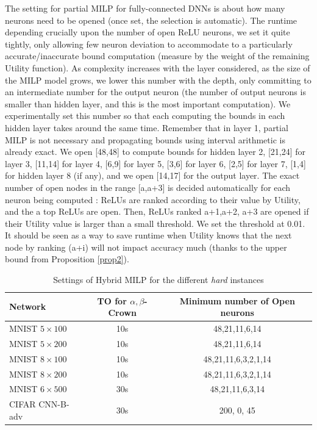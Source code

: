 The setting for partial MILP for fully-connected DNNs is about how many neurons need to be opened (once set, the selection is automatic). The runtime depending crucially upon the number of open ReLU neurons, we set it quite tightly, only allowing few neuron deviation to accommodate to a particularly accurate/inaccurate bound computation (measure by the weight of the remaining Utility function). As complexity increases with the layer considered, as the size of the MILP model grows, we lower this number with the depth, only committing to an intermediate number for the output neuron (the number of output neurons  is smaller than hidden layer, and this is the most important computation). We experimentally set this number so that each computing the bounds in each hidden layer takes around the same time. Remember that in layer 1, partial MILP is not necessary and propagating bounds using interval arithmetic is already exact. We open [48,48] to compute bounds for hidden layer 2, [21,24] for layer 3, [11,14] for layer 4, [6,9] for layer 5, [3,6] for layer 6, [2,5] for layer 7, [1,4] for hidden layer 8 (if any), and we open [14,17] for the output layer.
 The exact number of open nodes in the range [a,a+3] is decided automatically for each neuron being computed : ReLUs are ranked according to their value by Utility, and the a top ReLUs are open. Then, ReLUs ranked a+1,a+2, a+3 are opened if their Utility value is larger than a small threshold. We set the threshold at 0.01. It should be seen as a way to save runtime when Utility knows that the next node by ranking (a+i) will not impact accuracy much (thanks to the upper bound from Proposition \ref{prop2}).

\begin{table}[b!]
	\centering
	\begin{tabular}{||l||c|c||}
		\hline \hline
		Network & TO for $\alpha,\beta$-Crown  & Minimum number of Open neurons  \\ 		  
		\hline
		MNIST $5 \times 100$ & 10s  & 48,21,11,6,14  \\ \hline
		MNIST $5 \times 200$ & 10s & 48,21,11,6,14  \\ \hline
		MNIST $8 \times 100$ & 10s  & 48,21,11,6,3,2,1,14  \\ \hline
		MNIST $8 \times 200$ & 10s & 48,21,11,6,3,2,1,14  \\ \hline
		MNIST $6 \times 500$ & 30s & 48,21,11,6,3,14 \\ \hline
		CIFAR CNN-B-adv & 30s & 200, 0, 45 \\ \hline \hline
	\end{tabular}
	\caption{Settings of Hybrid MILP for the different {\em hard} instances}
	\label{table20}
	\end{table}


